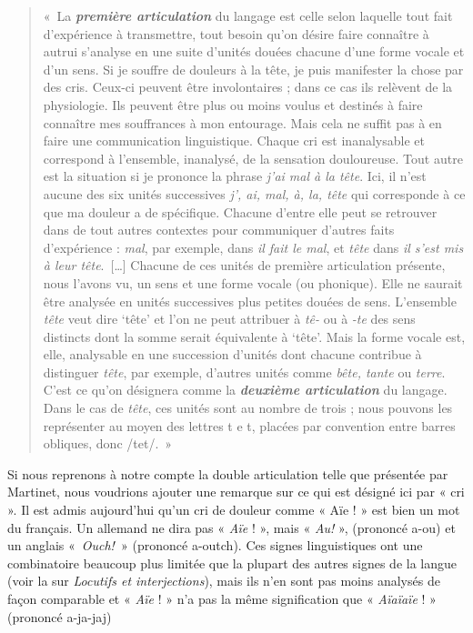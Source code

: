 {    \begin{quote}
    «~La \textbf{\textit{première articulation}} du langage est celle selon laquelle tout fait d’expérience à transmettre, tout besoin qu’on désire faire connaître à autrui s’analyse en une suite d’unités douées chacune d’une forme vocale et d’un sens. Si je souffre de douleurs à la tête, je puis manifester la chose par des cris. Ceux-ci peuvent être involontaires ; dans ce cas ils relèvent de la physiologie. Ils peuvent être plus ou moins voulus et destinés à faire connaître mes souffrances à mon entourage. Mais cela ne suffit pas à en faire une communication linguistique. Chaque cri est inanalysable et correspond à l’ensemble, inanalysé, de la sensation douloureuse. Tout autre est la situation si je prononce la phrase \textit{j’ai mal à la tête}. Ici, il n’est aucune des six unités successives \textit{j’, ai, mal, à, la, tête} qui corresponde à ce que ma douleur a de spécifique. Chacune d’entre elle peut se retrouver dans de tout autres contextes pour communiquer d’autres faits d’expérience : \textit{mal}, par exemple, dans \textit{il fait le mal}, et \textit{tête} dans \textit{il s’est mis à leur tête}.~[…] Chacune de ces unités de première articulation présente, nous l’avons vu, un sens et une forme vocale (ou phonique). Elle ne saurait être analysée en unités successives plus petites douées de sens. L’ensemble \textit{tête} veut dire ‘tête’ et l’on ne peut attribuer à \textit{tê-} ou à \textit{{}-te} des sens distincts dont la somme serait équivalente à ‘tête’. Mais la forme vocale est, elle, analysable en une succession d’unités dont chacune contribue à distinguer \textit{tête}, par exemple, d’autres unités comme \textit{bête, tante} ou \textit{terre}. C’est ce qu’on désignera comme la \textbf{\textit{deuxième articulation}} du langage. Dans le cas de \textit{tête}, ces unités sont au nombre de trois ; nous pouvons les représenter au moyen des lettres t e t, placées par convention entre barres obliques, donc /tet/.~»
    \end{quote}

    Si nous reprenons à notre compte la double articulation telle que présentée par Martinet, nous voudrions ajouter une remarque sur ce qui est désigné ici par « cri ». Il est admis aujourd’hui qu’un cri de douleur comme « Aïe ! » est bien un mot du français. Un allemand ne dira pas « \textit{Aïe} ! », mais « \textit{Au!} », (prononcé a-ou) et un anglais «~\textit{Ouch!~}» (prononcé a-outch). Ces signes linguistiques ont une combinatoire beaucoup plus limitée que la plupart des autres signes de la langue (voir la  sur \textit{Locutifs et interjections}), mais ils n’en sont pas moins analysés de façon comparable et « \textit{Aïe} ! » n’a pas la même signification que « \textit{Aïaïaïe} ! » (prononcé a-ja-jaj)
}
